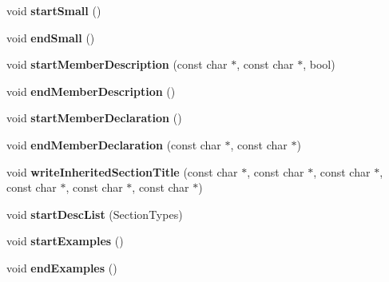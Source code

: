 \begin{DoxyCompactItemize}
\mbox{\label{class_r_t_f_generator_abef7c0c5864bfb1dfce99d181ae1e51c}} 
void {\bfseries start\+Small} ()
\item 
\mbox{\label{class_r_t_f_generator_a2ac789ba16b4fa9f8c64fe59041e9699}} 
void {\bfseries end\+Small} ()
\item 
\mbox{\label{class_r_t_f_generator_a6e81e56520046db02d8e71a195a10a32}} 
void {\bfseries start\+Member\+Description} (const char $\ast$, const char $\ast$, bool)
\item 
\mbox{\label{class_r_t_f_generator_a0917bcbff0ed93c3f75da305b0f2f1be}} 
void {\bfseries end\+Member\+Description} ()
\item 
\mbox{\label{class_r_t_f_generator_a733845745c3daac9a3700cedbbfc170a}} 
void {\bfseries start\+Member\+Declaration} ()
\item 
\mbox{\label{class_r_t_f_generator_af6b3e0830a873ad488dd3f2773f7ec15}} 
void {\bfseries end\+Member\+Declaration} (const char $\ast$, const char $\ast$)
\item 
\mbox{\label{class_r_t_f_generator_aaeb7e296fe3ca59058849fbee8340eb6}} 
void {\bfseries write\+Inherited\+Section\+Title} (const char $\ast$, const char $\ast$, const char $\ast$, const char $\ast$, const char $\ast$, const char $\ast$)
\item 
\mbox{\label{class_r_t_f_generator_a338a41a2e7386886111024d33bc8ac77}} 
void {\bfseries start\+Desc\+List} (Section\+Types)
\item 
\mbox{\label{class_r_t_f_generator_af78b770d5f1286d6cd152ef61efd8edb}} 
void {\bfseries start\+Examples} ()
\item 
\mbox{\label{class_r_t_f_generator_a3b922b80ee9cea8451bb53d712adbe8a}} 
void {\bfseries end\+Examples} ()
\item 
\mbox{\label{class_r_t_f_generator_a009a5bf6c30b65c6aa66d9cd924f0af7}} 

\end{DoxyCompactItemize}
